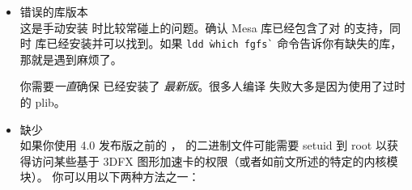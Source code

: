 \begin{itemize}

\ifchinese
\item{错误的库版本}\\
这是手动安装 \FlightGear{} 时比较常碰上的问题。确认 Mesa 库已经包含了对  的支持，同时  库已经安装并可以找到。如果 \texttt{ldd \`which fgfs\`} 命令告诉你有缺失的库，那就是遇到麻烦了。

你需要\emph{一直}确保 \PLIB{} 已经安装了 \emph{最新版}。很多人编译 \FlightGear{} 失败大多是因为使用了过时的 plib。
\fi
\iffalse
\IfLanguageName{english}{
\item{Wrong library versions}\\
  This is a rather common cause of grief especially when you prefer to
  install the libraries needed by \FlightGear{} by hand. Be sure that
  especially the Mesa library contains support for the
  \Index{3DFX} board and that \Index{GLIDE} libraries are installed and can be
  found. If a \texttt{ldd \`which fgfs\`} complains about missing
  libraries you are in trouble.

  You should also be sure to \emph{always} keep the \emph{latest} version
  of \PLIB{} on your system. Lots of people have
  failed miserably to compile \FlightGear{} just because of an outdated
  plib.
}{}
\IfLanguageName{french}{
\item{Mauvaises versions des biblioth\`{e}ques}\\
  C'est une origine assez commune de griefs tout sp\'{e}cialement lorsque vous
  pr\'{e}f\'{e}rez installer les biblioth\`{e}ques n\'{e}cessaires \`{a} \FlightGear{}
  \`{a} la main. V\'{e}rifiez bien que, en particulier, la biblioth\`{e}que Mesa comprend bien
  la prise en charge de la carte \Index{3DFX} et que les biblioth\`{e}ques \Index{GLIDE} sont install\'{e}es et qu'elles peuvent \^{e}tre
  trouv\'{e}es. Si un \texttt{ldd \`which fgfs\`} se plaint de biblioth\`{e}ques manquantes, alors vous aurez des difficult\'{e}s.

  Soyez \'{e}galement certain de \emph{toujours} disposer de la \emph{derni\`{e}re} version
  de \PLIB{} sur votre syst\`{e}me. De nombreuses personnes ont lamentablement \'{e}chou\'{e} \`{a} compiler \FlightGear{} simplement
  \`{a} cause d'une version trop ancienne de plib.
}{}
\fi

\ifchinese
\item{缺少}\\
如果你使用 4.0 发布版之前的 ，\FlightGear{} 的二进制文件可能需要 setuid 到 root 以获得访问某些基于 3DFX 图形加速卡的权限（或者如前文所述的特定的内核模块）。
你可以用以下两种方法之一：


\end{itemize}
